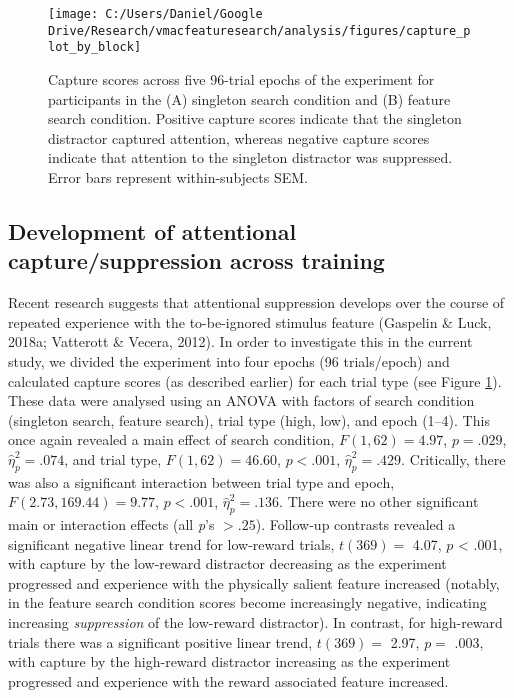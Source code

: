 \documentclass[man, a4paper, noextraspace, 11pt,floatsintext]{apa6}
\theoremstyle{definition}
\theoremstyle{definition}
\theoremstyle{definition}
\theoremstyle{remark}
\begin{document}
\begin{figure}[!h]

{\centering \texttt{[image: C:/Users/Daniel/Google Drive/Research/vmacfeaturesearch/analysis/figures/capture\_plot\_by\_block]} 

}

\caption{Capture scores across five 96-trial epochs of the
experiment for participants in the (A) singleton search condition and
(B) feature search condition. Positive capture scores indicate that the
singleton distractor captured attention, whereas negative capture scores
indicate that attention to the singleton distractor was suppressed.
Error bars represent within-subjects SEM.}\label{fig:blockPlot}
\end{figure}

\subsection{Development of attentional capture/suppression across
training}\label{development-of-attentional-capturesuppression-across-training}

Recent research suggests that attentional suppression develops over the
course of repeated experience with the to-be-ignored stimulus feature
(Gaspelin \& Luck, 2018a; Vatterott \& Vecera, 2012). In order to
investigate this in the current study, we divided the experiment into
four epochs (96 trials/epoch) and calculated capture scores (as
described earlier) for each trial type (see Figure \ref{fig:blockPlot}).
These data were analysed using an ANOVA with factors of search condition
(singleton search, feature search), trial type (high, low), and epoch
(1--4). This once again revealed a main effect of search condition,
\(F(1, 62) = 4.97\), \(p = .029\), \(\hat{\eta}^2_p = .074\), and trial
type, \(F(1, 62) = 46.60\), \(p < .001\), \(\hat{\eta}^2_p = .429\).
Critically, there was also a significant interaction between trial type
and epoch, \(F(2.73, 169.44) = 9.77\), \(p < .001\),
\(\hat{\eta}^2_p = .136\). There were no other significant main or
interaction effects (all \emph{p}'s \(>.25\)). Follow-up contrasts
revealed a significant negative linear trend for low-reward trials,
\(t(369)=\) 4.07, \(p\) \textless{} .001, with capture by the low-reward
distractor decreasing as the experiment progressed and experience with
the physically salient feature increased (notably, in the feature search
condition scores become increasingly negative, indicating increasing
\emph{suppression} of the low-reward distractor). In contrast, for
high-reward trials there was a significant positive linear trend,
\(t(369)=\) 2.97, \(p=\) .003, with capture by the high-reward
distractor increasing as the experiment progressed and experience with
the reward associated feature increased.
\end{document}
